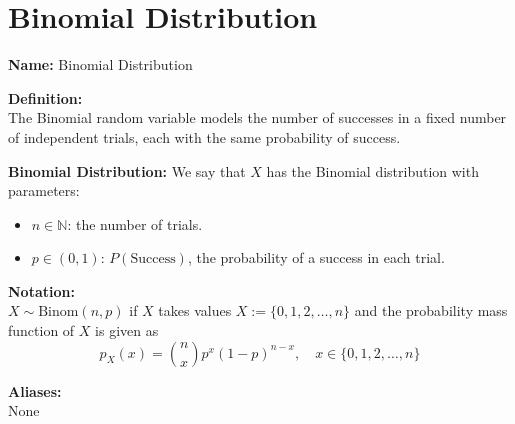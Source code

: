 \documentclass{article}
\begin{document}
\section*{Binomial Distribution}

\textbf{Name:} Binomial Distribution

\textbf{Definition:} \\
The Binomial random variable models the number of successes in a fixed number of independent trials, each with the same probability of success.

\textbf{Binomial Distribution:} We say that \( X \) has the Binomial distribution with parameters:
\begin{itemize}
    \item \( n \in \mathbb{N} \): the number of trials.
    \item \( p \in (0, 1) \): \( P(\text{Success}) \), the probability of a success in each trial.
\end{itemize}

\textbf{Notation:} \\
\( X \sim \text{Binom}(n, p) \) if \( X \) takes values \( X := \{0, 1, 2, \ldots, n\} \) and the probability mass function of \( X \) is given as
\[
p_X(x) = \binom{n}{x} p^x (1 - p)^{n - x}, \quad x \in \{0, 1, 2, \ldots, n\}
\]

\textbf{Aliases:} \\
None
\end{document}
